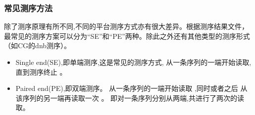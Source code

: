 \documentclass[12pt]{beamer}
\begin{document}
\begin{frame}\frametitle{常见测序方法}
  \begin{tcolorbox}[colback=backg!5,colframe=backg,title=测序方法]
    除了测序原理有所不同,不同的平台测序方式亦有很大差异。根据测序结果文件，最常见的测序方案可以分为“SE”和“PE”两种。除此之外还有其他类型的测序形式（如CG的dnb测序）。
  \end{tcolorbox}
  \begin{itemize}
    \item Single end(SE),即单端测序,这是常见的测序方式, 从一条序列的一端开始读取,直到测序终止 。
    \item Paired end(PE),即双端测序。 从一条序列的一端开始读取 ,同时或者之后 从该序列的另一端再读取一次 。 即对一条序列分别从两端,共进行了两次的读取。
\end{itemize}
\end{frame}
\end{document}
